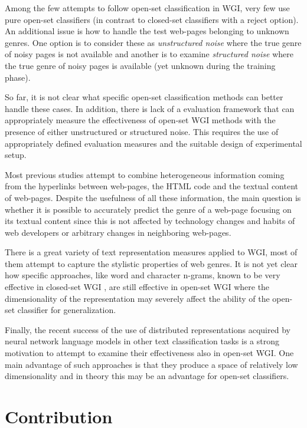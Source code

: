 \begin{itemize}
Among the few attempts to follow open-set classification in WGI, very few use pure open-set classifiers (in contrast to closed-set classifiers with a reject option). An additional issue is how to handle the test web-pages belonging to unknown genres. One option is to consider these as \textit{unstructured noise} where the true genre of noisy pages is not available and another is to examine \textit{structured noise} where the true genre of noisy pages is available (yet unknown during the training phase). 

So far, it is not clear what specific open-set classification methods can better handle these cases. In addition, there is lack of a evaluation framework that can appropriately measure the effectiveness of open-set WGI methods with the presence of either unstructured or structured noise. This requires the use of appropriately defined evaluation measures and the suitable design of experimental setup.

Most previous studies attempt to combine heterogeneous information coming from the hyperlinks between web-pages, the HTML code and the textual content of web-pages. Despite the usefulness of all these information, the main question is whether it is possible to accurately predict the genre of a web-page focusing on its textual content since this is not affected by technology changes and habits of web developers or arbitrary changes in neighboring web-pages. 

There is a great variety of text representation measures applied to WGI, most of them attempt to capture the stylistic properties of web genres. It is not yet clear how specific approaches, like word and character n-grams, known to be very effective in closed-set WGI \parencite{sharoff2010web}, are still effective in open-set WGI where the dimensionality of the representation may severely affect the ability of the open-set classifier for  generalization.

Finally, the recent success of the use of distributed representations acquired by neural network language models in other text classification tasks is a strong motivation to attempt to examine their effectiveness also in open-set WGI. One main advantage of such approaches is that they produce a space of relatively low dimensionality and in theory this may be an advantage for open-set classifiers.

\section{Contribution} \label{chap:introduction:sec:contribution}


\end{itemize}
